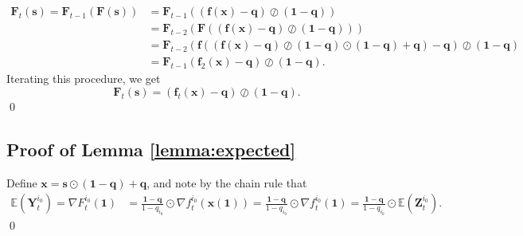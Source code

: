 \documentclass[preprint,3p,12pt]{elsarticle}
\theoremstyle{definition}
\begin{document}
\begin{align*}
  \boldsymbol{F}_t(\boldsymbol{s}) = \boldsymbol{F}_{t-1}(\boldsymbol{F}(\boldsymbol{s})) &= \boldsymbol{F}_{t-1}((\boldsymbol{f}(\boldsymbol{x}) - \boldsymbol{q}) \oslash (\boldsymbol{1} - \boldsymbol{q}))\\
  &= \boldsymbol{F}_{t-2}(\boldsymbol{F}((\boldsymbol{f}(\boldsymbol{x}) - \boldsymbol{q}) \oslash (\boldsymbol{1} - \boldsymbol{q})))\\
  &= \boldsymbol{F}_{t-2}(\boldsymbol{f}((\boldsymbol{f}(\boldsymbol{x}) - \boldsymbol{q}) \oslash (\boldsymbol{1} - \boldsymbol{q}) \odot(\boldsymbol{1} - \boldsymbol{q}) + \boldsymbol{q})-\boldsymbol{q}) \oslash (\boldsymbol{1} - \boldsymbol{q})\\
  &= \boldsymbol{F}_{t-1}(\boldsymbol{f}_2(\boldsymbol{x}) - \boldsymbol{q}) \oslash (\boldsymbol{1} - \boldsymbol{q}).
\end{align*}
Iterating this procedure, we get
\begin{equation*}
  \boldsymbol{F}_t(\boldsymbol{s}) = (\boldsymbol{f}_t(\boldsymbol{x}) - \boldsymbol{q}) \oslash (\boldsymbol{1} - \boldsymbol{q}).
\end{equation*}
\qed

\subsection{Proof of Lemma \ref{lemma:expected}}\label{expect_hs}
      Define $\boldsymbol{x} = \boldsymbol{s} \odot (\boldsymbol{1} - \boldsymbol{q}) + \boldsymbol{q}$, and note by the chain rule that
\begin{align*}
    \mathbb{E}(\boldsymbol{Y}^{i_0}_t) %
    = \nabla F^{i_0}_t (\boldsymbol{1}) 
    &=\frac{\boldsymbol{1}-\boldsymbol{q}}{1-q_{i_0}}\odot\nabla f^{i_0}_t (\boldsymbol{x}(\boldsymbol{1})) 
    =\frac{\boldsymbol{1}-\boldsymbol{q}}{1-q_{i_0}}\odot\nabla f^{i_0}_t(\boldsymbol{1})
    = \frac{\boldsymbol{1}-\boldsymbol{q}}{1-q_{i_0}}\odot\mathbb{E}(\boldsymbol{Z}_t^{i_0}).
\end{align*}\qed
\end{document}
